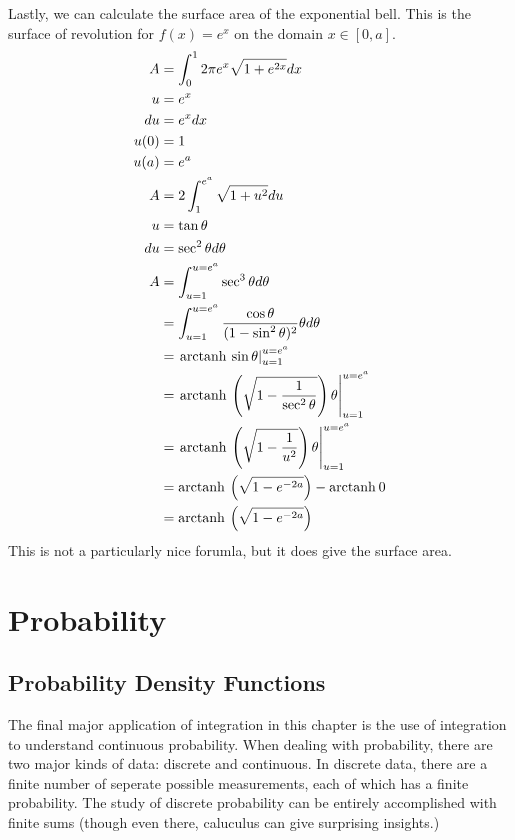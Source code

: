 \documentclass[fleqn]{report}
\begin{document}
\begin{example}
Lastly, we can calculate the surface area of the exponential
bell. This is the surface of revolution for $f(x) = e^{x}$
on the domain $x \in [0, a]$. 
\begin{align*}
A & = \int_0^1 2\pi e^x \sqrt{1 + e^{2x}} dx \\
u & = e^x \\
du & = e^x dx \\
u(0) & = 1 \\
u(a) & = e^a \\
A & = 2\int_1^{e^a} \sqrt{1+u^2} du \\
u & = \tan \theta \\
du & = \sec^2 \theta d \theta \\
A & = \int_{u=1}^{u=e^a} \sec^3 \theta d \theta \\
& = \int_{u=1}^{u=e^a} \frac{\cos \theta}{(1-\sin^2 \theta)^2}
\theta d \theta \\
& = \left. \mathrm{arctanh\hspace{0.07cm}} \sin \theta \right|_{u=1}^{u=e^a} \\
& = \left. \mathrm{arctanh\hspace{0.07cm}} \left( \sqrt{1 - \frac{1}{\sec^2 \theta}}
\right) \theta \right|_{u=1}^{u=e^a} \\
& = \left. \mathrm{arctanh\hspace{0.07cm}} \left( \sqrt{1 - \frac{1}{u^2}}
\right) \theta \right|_{u=1}^{u=e^a} \\
& = \mathrm{arctanh\hspace{0.07cm}} \left( \sqrt{1 - e^{-2a}} \right) -\mathrm{arctanh\hspace{0.07cm}} 0 \\
& = \mathrm{arctanh\hspace{0.07cm}} \left( \sqrt{1 - e^{-2a}} \right) 
\end{align*}
This is not a particularly nice forumla, but it does give the
surface area.
\end{example}

\section{Probability}
\label{probability}

\subsection{Probability Density Functions}
\label{density-functions}

The final major application of integration in this chapter is
the use of integration to understand continuous probability.
When dealing with probability, there are two major kinds of
data: discrete and continuous. In discrete data, there are a
finite number of seperate possible measurements, each of which
has a finite probability. The study of discrete probability
can be entirely accomplished with finite sums (though even
there, caluculus can give surprising insights.)
\end{document}
